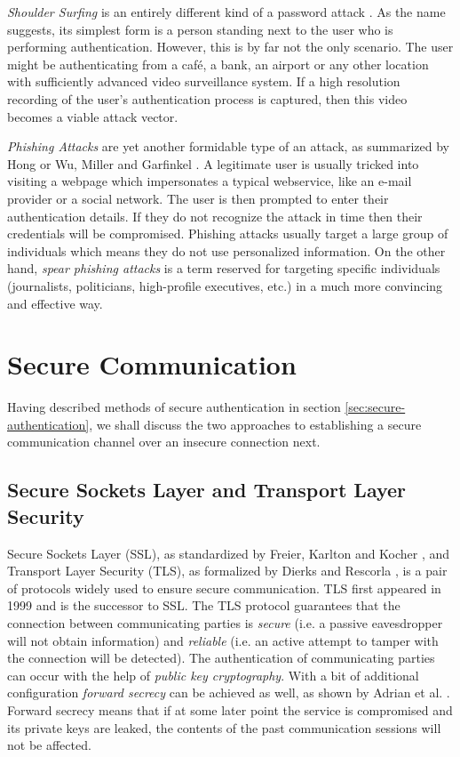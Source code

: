 \emph{Shoulder Surfing} is an entirely different kind of a password attack \cite{raza:2012:password-attacks-survey, suo:2005:graphical-passwords-survey} . As the name suggests, its simplest form is a person standing next to the user who is performing authentication. However, this is by far not the only scenario. The user might be authenticating from a café, a bank, an airport or any other location with sufficiently advanced video surveillance system. If a high resolution recording of the user's authentication process is captured, then this video becomes a viable attack vector.

\emph{Phishing Attacks} are yet another formidable type of an attack, as summarized by Hong \cite{hong2012state} or Wu, Miller and Garfinkel \cite{Wu:2006:STA:1124772.1124863}. A legitimate user is usually tricked into visiting a webpage which impersonates a typical webservice, like an e-mail provider or a social network. The user is then prompted to enter their authentication details. If they do not recognize the attack in time then their credentials will be compromised. Phishing attacks usually target a large group of individuals which means they do not use personalized information. On the other hand, \emph{spear phishing attacks} is a term reserved for targeting specific individuals (journalists, politicians, high-profile executives, etc.) in a much more convincing and effective way.

\section{Secure Communication}
\label{sec:secure-communication}

Having described methods of secure authentication in section \ref{sec:secure-authentication}, we shall discuss the two approaches to establishing a secure communication channel over an insecure connection next.

\subsection{Secure Sockets Layer and Transport Layer Security}
\label{subsec:ssl-tls}

Secure Sockets Layer (SSL), as standardized by Freier, Karlton and Kocher \cite{rfc6101}, and Transport Layer Security (TLS), as formalized by Dierks and Rescorla \cite{rfc5246}, is a pair of protocols widely used to ensure secure communication. TLS first appeared in 1999 and is the successor to SSL. The TLS protocol guarantees that the connection between communicating parties is \emph{secure} (i.e. a passive eavesdropper will not obtain information) and \emph{reliable} (i.e. an active attempt to tamper with the connection will be detected). The authentication of communicating parties can occur with the help of \emph{public key cryptography}. With a bit of additional configuration \emph{forward secrecy} can be achieved as well, as shown by Adrian et al. \cite{Adrian:2015:IFS:2810103.2813707}. Forward secrecy means that if at some later point the service is compromised and its private keys are leaked, the contents of the past communication sessions will not be affected.


